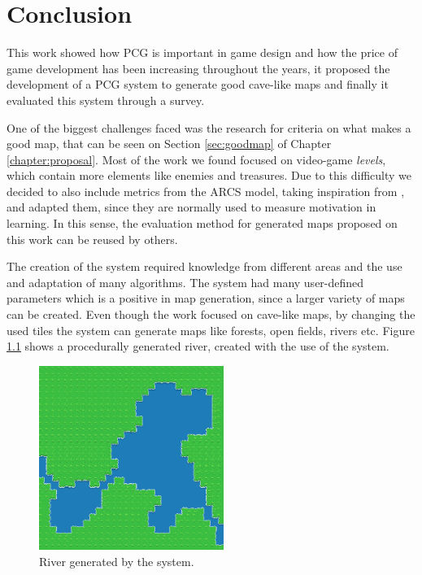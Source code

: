 \chapter{Conclusion}
\label{chapter:conclusion}

This work showed how PCG is important in game design and how the price of game development has been increasing throughout the years, it proposed the development of a PCG system to generate good cave-like maps and finally it evaluated this system through a survey.

One of the biggest challenges faced was the research for criteria on what makes a good map, that can be seen on Section \ref{sec:goodmap} of Chapter \ref{chapter:proposal}. Most of the work we found focused on video-game \emph{levels}, which contain more elements like enemies and treasures. Due to this difficulty we decided to also include metrics from the ARCS model, taking inspiration from \cite{carvalho:2016}, and adapted them, since they are normally used to measure motivation in learning. In this sense, the evaluation method for generated maps proposed on this work can be reused by others.

The creation of the system required knowledge from different areas and the use and adaptation of many algorithms. The system had many user-defined parameters which is a positive in map generation, since a larger variety of maps can be created. Even though the work focused on cave-like maps, by changing the used tiles the system can generate maps like forests, open fields, rivers etc. Figure \ref{fig:river} shows a procedurally generated river, created with the use of the system.

\begin{figure}[h]
    \caption{River generated by the system.}
    \centerline{\includegraphics[width=6cm]{images/river.png}}
    \label{fig:river}
\end{figure}

